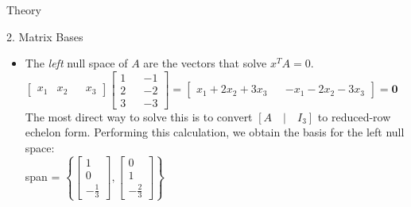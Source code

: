 \begin{section}{Theory}
\begin{homeworkSection}{2. Matrix Bases}
{\begin{itemize}
\item The \textit{left} null space of $A$ are the vectors that solve $x^TA = 0$. \\
$\begin{bmatrix} x_1 & x_2 && x_3 \end{bmatrix} \begin{bmatrix} 1 && -1 \\ 2 && -2 \\ 3 && -3 \end{bmatrix} = \begin{bmatrix} x_1+2x_2+3x_3 && -x_1-2x_2-3x_3 \end{bmatrix} = \bm{0}$ \\
The most direct way to solve this is to convert $ [ A \quad | \quad I_{3}  ] $ to reduced-row echelon form. Performing this calculation, we obtain the basis for the left null space: \\
span = $\left \{ \begin{bmatrix} 1 \\ 0 \\ -\frac{1}{3}\end{bmatrix},
                \begin{bmatrix} 0 \\ 1 \\ -\frac{2}{3}\end{bmatrix} \right \}
        $
\end{itemize}
}

\end{homeworkSection}



\end{section}
